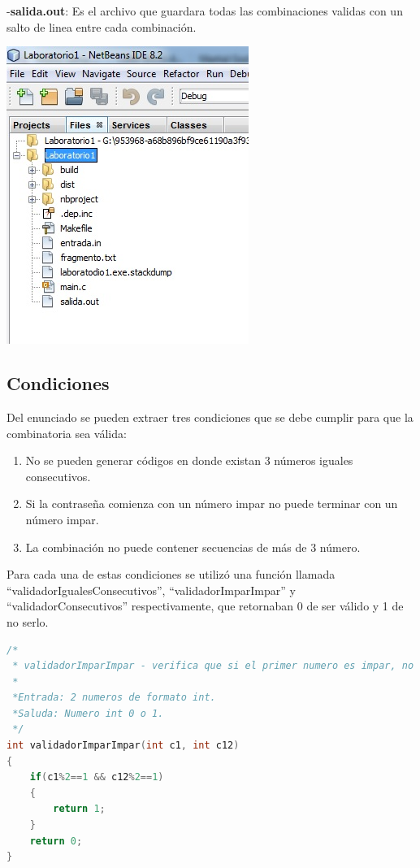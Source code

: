 \documentclass[9pt,twocolumn,twoside]{optica}
\begin{document}
-\textbf{salida.out}: Es el archivo que guardara todas las combinaciones validas con un salto de linea entre cada combinación.

\includegraphics[scale=1.1]{archivos.jpg}

\subsection{Condiciones}
Del enunciado se pueden extraer tres condiciones que se debe cumplir para que la combinatoria sea válida:
\begin{enumerate}
\item No se pueden generar códigos en donde existan 3 números iguales consecutivos.
\item Si la contraseña comienza con un número impar no puede terminar con un número impar.
\item La combinación no puede contener secuencias de más de 3 número.
\end{enumerate}
Para cada una de estas condiciones se utilizó una función llamada “validadorIgualesConsecutivos”, “validadorImparImpar” y “validadorConsecutivos” respectivamente, que retornaban 0 de ser válido y 1 de no serlo.

\begin{lstlisting}[language=C]
/*
 * validadorImparImpar - verifica que si el primer numero es impar, no termine en impar
 *
 *Entrada: 2 numeros de formato int.
 *Saluda: Numero int 0 o 1.
 */
int validadorImparImpar(int c1, int c12)
{
    if(c1%2==1 && c12%2==1)
    {
        return 1;
    }
    return 0;
}
\end{lstlisting}
\end{document}
